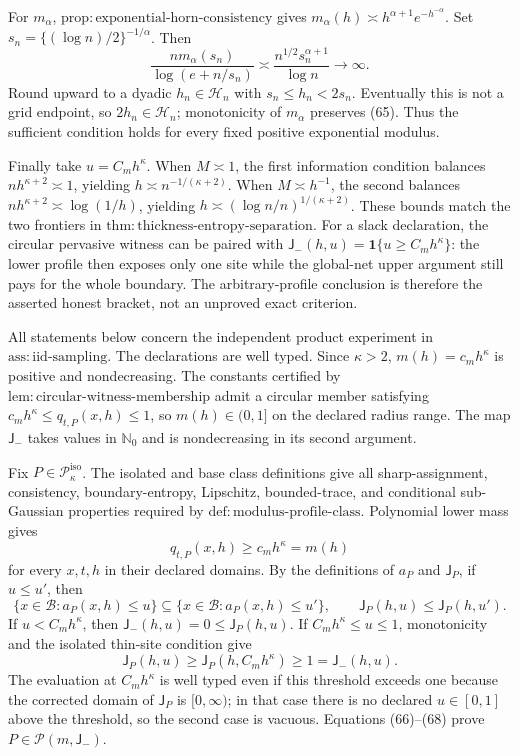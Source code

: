For \(m_\alpha\),
\(\mathrm{prop:exponential\text{-}horn\text{-}consistency}\) gives
\(m_\alpha(h)\asymp h^{\alpha+1}e^{-h^{-\alpha}}\).  Set
\(s_n=\{(\log n)/2\}^{-1/\alpha}\).  Then
\[
 \frac{nm_\alpha(s_n)}{\log(e+n/s_n)}
 \asymp\frac{n^{1/2}s_n^{\alpha+1}}{\log n}\longrightarrow\infty.
 \tag{65}
\]
Round upward to a dyadic \(h_n\in\mathcal H_n\) with
\(s_n\le h_n<2s_n\).  Eventually this is not a grid endpoint, so
\(2h_n\in\mathcal H_n\); monotonicity of \(m_\alpha\) preserves (65).
Thus the sufficient condition holds for every fixed positive exponential
modulus.

Finally take \(u=C_mh^\kappa\).  When \(M\asymp1\), the first information
condition balances \(nh^{\kappa+2}\asymp1\), yielding
\(h\asymp n^{-1/(\kappa+2)}\).  When \(M\asymp h^{-1}\), the second
balances \(nh^{\kappa+2}\asymp\log(1/h)\), yielding
\(h\asymp(\log n/n)^{1/(\kappa+2)}\).  These bounds match the two
frontiers in \(\mathrm{thm:thickness\text{-}entropy\text{-}separation}\).
For a slack declaration, the circular pervasive witness can be paired
with \(\mathsf J_{-}(h,u)=\mathbf1\{u\ge C_mh^\kappa\}\): the lower
profile then exposes only one site while the global-net upper argument
still pays for the whole boundary.  The arbitrary-profile conclusion is
therefore the asserted honest bracket, not an unproved exact criterion.

All statements below concern the independent product experiment in
\(\mathrm{ass:iid\text{-}sampling}\).  The declarations are well typed.
Since \(\kappa>2\), \(m(h)=c_mh^\kappa\) is positive and nondecreasing.
The constants certified by
\(\mathrm{lem:circular\text{-}witness\text{-}membership}\) admit a
circular member satisfying \(c_mh^\kappa\le q_{t,P}(x,h)\le1\), so
\(m(h)\in(0,1]\) on the declared radius range.  The map
\(\mathsf J_{-}\) takes values in \(\mathbb N_0\) and is nondecreasing
in its second argument.

Fix \(P\in\mathcal P_\kappa^{\mathrm{iso}}\).  The isolated and base
class definitions give all sharp-assignment, consistency,
boundary-entropy, Lipschitz, bounded-trace, and conditional sub-Gaussian
properties required by \(\mathrm{def:modulus\text{-}profile\text{-}class}\).
Polynomial lower mass gives
\[
 q_{t,P}(x,h)\ge c_mh^\kappa=m(h)
 \tag{66}
\]
for every \(x,t,h\) in their declared domains.  By the definitions of
\(a_P\) and \(\mathsf J_P\), if \(u\le u'\), then
\[
 \{x\in\mathcal B:a_P(x,h)\le u\}
 \subseteq\{x\in\mathcal B:a_P(x,h)\le u'\},
 \qquad \mathsf J_P(h,u)\le\mathsf J_P(h,u').
 \tag{67}
\]
If \(u<C_mh^\kappa\), then
\(\mathsf J_{-}(h,u)=0\le\mathsf J_P(h,u)\).  If
\(C_mh^\kappa\le u\le1\), monotonicity and the isolated thin-site
condition give
\[
 \mathsf J_P(h,u)\ge\mathsf J_P(h,C_mh^\kappa)
 \ge1=\mathsf J_{-}(h,u).
 \tag{68}
\]
The evaluation at \(C_mh^\kappa\) is well typed even if this threshold
exceeds one because the corrected domain of \(\mathsf J_P\) is
\([0,\infty)\); in that case there is no declared \(u\in[0,1]\) above
the threshold, so the second case is vacuous.  Equations (66)--(68) prove
\(P\in\mathcal P(m,\mathsf J_{-})\).

